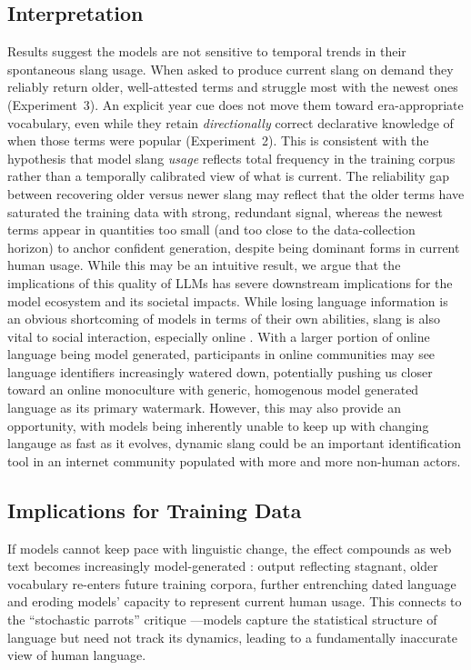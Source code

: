 \documentclass[11pt]{article}
\begin{document}
\subsection{Interpretation}

Results suggest the models are not sensitive to temporal trends in their spontaneous slang usage. When asked to produce current slang on demand they reliably return older, well-attested terms and struggle most with the newest ones (Experiment~3). An explicit year cue does not move them toward era-appropriate vocabulary, even while they retain \emph{directionally} correct declarative knowledge of when those terms were popular (Experiment~2). This is consistent with the hypothesis that model slang \textit{usage} reflects total frequency in the training corpus rather than a temporally calibrated view of what is current. The reliability gap between recovering older versus newer slang may reflect that the older terms have saturated the training data with strong, redundant signal, whereas the newest terms appear in quantities too small (and too close to the data-collection horizon) to anchor confident generation, despite being dominant forms in current human usage.
While this may be an intuitive result, we argue that the implications of this quality of LLMs has severe downstream implications for the model ecosystem and its societal impacts. While losing language information is an obvious shortcoming of models in terms of their own abilities, slang is also vital to social interaction, especially online \citep{eble1989slang, danescu-niculescu-mizil2013nocountry}. With a larger portion of online language being model generated, participants in online communities may see language identifiers increasingly watered down, potentially pushing us closer toward an online monoculture with generic, homogenous model generated language as its primary watermark.
However, this may also provide an opportunity, with models being inherently unable to keep up with changing langauge as fast as it evolves, dynamic slang could be an important identification tool in an internet community populated with more and more non-human actors.


\subsection{Implications for Training Data}

If models cannot keep pace with linguistic change, the effect compounds as web text becomes increasingly model-generated \citep{shumailov2023curse}: output reflecting stagnant, older vocabulary re-enters future training corpora, further entrenching dated language and eroding models' capacity to represent current human usage. This connects to the ``stochastic parrots'' critique \citep{bender2021parrots}---models capture the statistical structure of language but need not track its dynamics, leading to a fundamentally inaccurate view of human language.
\end{document}
